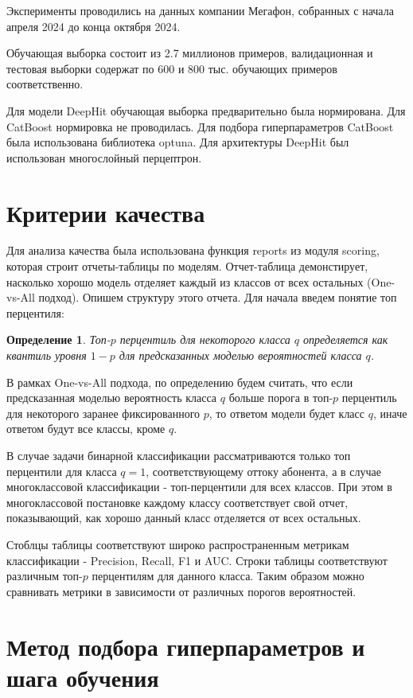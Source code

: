 \documentclass[a4paper,14pt,oneside,openany]{memoir}
\newtheorem{definition}{Определение}
\begin{document}
Эксперименты проводились на данных компании Мегафон, собранных с начала апреля 2024 до конца октября 2024. 

Обучающая выборка состоит из 2.7 миллионов примеров, валидационная и тестовая выборки содержат по 600 и 800 тыс. обучающих примеров соответственно. 

Для модели DeepHit обучающая выборка предварительно была нормирована. Для CatBoost нормировка не проводилась. Для подбора гиперпараметров CatBoost была использована библиотека optuna. Для архитектуры DeepHit был использован многослойный перцептрон.

\section{Критерии качества}

Для анализа качества была использована функция reports из модуля scoring, которая строит отчеты-таблицы по моделям. Отчет-таблица демонстирует, насколько хорошо модель отделяет каждый из классов от всех остальных (One-vs-All подход). Опишем структуру этого отчета. Для начала введем понятие топ перцентиля: 

\begin{definition}
Топ-$p$ перцентиль для некоторого класса $q$ определяется как квантиль уровня $1-p$ для предсказанных моделью вероятностей класса $q$.
\end{definition}

В рамках One-vs-All подхода, по определению будем считать, что если предсказанная моделью вероятность класса $q$ больше порога в топ-$p$ перцентиль для некоторого заранее фиксированного $p$, то ответом модели будет класс $q$, иначе ответом будут все классы, кроме $q$.

В случае задачи бинарной классификации рассматриваются только топ перцентили для класса $q = 1$, соответствующему оттоку абонента, а в случае многоклассовой классификации - топ-перцентили для всех классов. При этом в многоклассовой постановке каждому классу соответствует свой отчет, показывающий, как хорошо данный класс отделяется от всех остальных. 

Стоблцы таблицы соответствуют широко распространенным метрикам классификации - Precision, Recall, F1 и AUC. Строки таблицы соответствуют различным топ-$p$ перцентилям для данного класса. Таким образом можно сравнивать метрики в зависимости от различных порогов вероятностей. 

\section{Метод подбора гиперпараметров и шага обучения}
\end{document}
